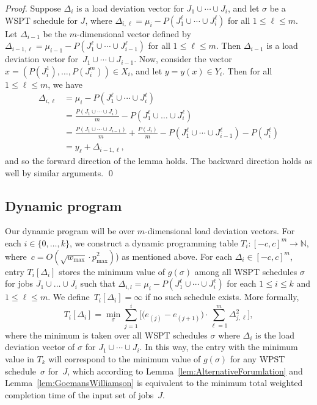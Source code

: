 \documentclass[11pt]{llncs}
\begin{document}
\begin{proof}
Suppose $\Delta_i$ is a load deviation vector for $J_1 \cup \cdots \cup J_i$, and let $\sigma$ be a WSPT schedule for $J$, where $\Delta_{i,\ell} = \mu_i-P(J_1^\ell \cup \cdots \cup J_i^\ell)$ for all $1 \leq \ell \leq m$. Let $\Delta_{i-1}$ be the $m$-dimensional vector defined by~$\Delta_{i-1,\ell} = \mu_{i-1}-P(J_1^\ell \cup \cdots \cup J_{i-1}^\ell)$ for all $1 \leq \ell \leq m$. Then $\Delta_{i-1}$ is a load deviation vector for~$J_1 \cup \cdots \cup J_{i-1}$. Now, consider the vector $x = (P(J^1_i),\ldots,P(J^m_i)) \in X_i$, and let $y=y(x) \in Y_i$. Then for all $1 \leq \ell \leq m$, we have
\begin{align*}
\Delta_{i,\ell} &= \mu_i-P(J_1^\ell \cup \cdots \cup J_i^\ell) \\ 
&= \frac{P(J_1 \cup \cdots \cup J_i)}{m} -  P(J_1^\ell \cup \dots \cup J_i^\ell) \\
&=  \frac{P(J_1 \cup \cdots \cup J_{i-1})}{m} + \frac{P(J_i)}{m} -  P(J_1^\ell \cup \cdots \cup J_{i-1}^\ell)-P(J^\ell_i) \\
&= %
y_\ell + \Delta_{i-1,\ell},
\end{align*}
and so the forward direction of the lemma holds. The backward direction holds as well by similar arguments. \qed    
\end{proof}


\subsection{Dynamic program}

Our dynamic program will be over $m$-dimensional load deviation vectors. For each $i \in \{0,\ldots,k\}$, we construct a dynamic programming table $T_i \colon [-c, c]^m \to \mathbb{N}$, where~$c=O(\sqrt{w_{\max}} \cdot p^2_{\max})$) as mentioned above. For each $\Delta_i \in [-c, c]^m$, entry $T_i[\Delta_i]$ stores the minimum value of $g(\sigma)$ among all WSPT schedules $\sigma$ for jobs $J_1\cup \dots \cup J_i$ such that $\Delta_{i,l}=\mu_i- P(J^\ell_1 \cup \cdots \cup J^\ell_i)$ for each $1 \leq i \leq k$ and $1 \leq \ell \leq m$. We define~$T_i[\Delta_i]=\infty$ if no such schedule exists. More formally, 
$$
T_i[\Delta_i] = \min_{\sigma} \sum_{j = 1}^{i}  \Big[ \big(e_{(j)}-e_{(j+1)}\big)  \cdot \sum^m_{\ell=1} \Delta^2_{j,\ell} \Big],
$$ 
where the minimum is taken over all WSPT schedules $\sigma$ where $\Delta_i$ is the load deviation vector of $\sigma$ for $J_1 \cup \cdots \cup J_i$. In this way, the entry with the minimum value in $T_k$ will correspond to the minimum value of $g(\sigma)$ for any WPST schedule~$\sigma$ for~$J$, which according to Lemma~\ref{lem:AlternativeForumlation} and Lemma~\ref{lem:GoemansWilliamson} is equivalent to the minimum total weighted completion time of the input set of jobs~$J$.
\end{document}
